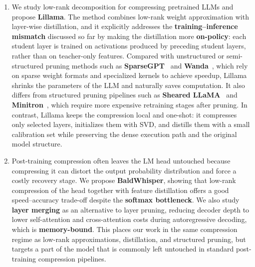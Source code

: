 \begin{enumerate}
    \item We study low-rank decomposition for compressing pretrained LLMs and
    propose \textbf{Lillama}. The method combines low-rank weight
    approximation with layer-wise distillation, and it explicitly addresses the
    \textbf{training--inference mismatch} discussed so far by making the distillation more
    \textbf{on-policy}: each student layer is trained on activations produced by
    preceding student layers, rather than on teacher-only features. 
    Compared with unstructured or semi-structured pruning methods such as
    \textbf{SparseGPT}~\citep{frantar2023sparsegpt} and
    \textbf{Wanda}~\citep{sun2024wanda}, which rely on sparse weight formats
    and specialized kernels to achieve speedup, Lillama shrinks the parameters
    of the LLM and naturally saves computation. It also differs
    from structured pruning pipelines such as
    \textbf{Sheared LLaMA}~\citep{xia2024sheared} and
    \textbf{Minitron}~\citep{muralidharan2024compact,sreenivas2024minitron},
    which require more expensive retraining stages after pruning. In contrast,
    Lillama keeps the compression local and one-shot: it compresses only
    selected layers, initializes them with SVD, and distills them with a small
    calibration set while preserving the dense execution path and the original
    model structure.

    \item Post-training compression often leaves the LM head untouched because
    compressing it can distort the output probability distribution and force a
    costly recovery stage. We propose \textbf{BaldWhisper}, showing that
    low-rank compression of the head together with feature distillation offers a
    good speed--accuracy trade-off despite the \textbf{softmax bottleneck}.
    We also study \textbf{layer merging} as an alternative to layer pruning,
    reducing decoder depth to lower self-attention and cross-attention costs
    during autoregressive decoding, which is \textbf{memory-bound}. This
    places our work in the same compression regime as low-rank approximations,
    distillation, and structured pruning, but targets a part of the model that
    is commonly left untouched in standard post-training compression pipelines.
\end{enumerate}

